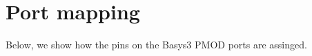 \documentclass[letterpaper,10pt,english]{sphinxmanual}
\begin{document}
\section{Port mapping}
\label{\detokenize{controller_features:port-mapping}}
Below, we show how the pins on the Basys3 PMOD ports are assinged.

\begin{sphinxVerbatim}[commandchars=\\\{\}]


\end{sphinxVerbatim}
\end{document}

